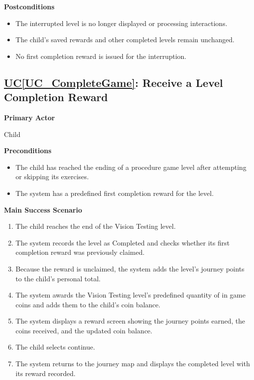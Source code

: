 \documentclass[12pt]{article}
\newcounter{ucnum} %
\newcommand{\ucref}[1]{\hyperref[#1]{UC\ref*{#1}}}
\begin{document}
\textbf{Postconditions}
\begin{itemize}
    \item The interrupted level is no longer displayed or processing
    interactions.
    \item The child's saved rewards and other completed levels
    remain unchanged.
    \item No first completion reward is issued for the interruption.
\end{itemize}

\label{UC_CompleteGame}
\subsection{\ucref{UC_CompleteGame}: Receive a Level Completion Reward}

\textbf{Primary Actor}

Child

\textbf{Preconditions}
\begin{itemize}
    \item The child has reached the ending of a procedure game level
    after attempting or skipping its exercises.
    \item The system has a predefined first completion reward for
    the level.
\end{itemize}

\textbf{Main Success Scenario}
\begin{enumerate}
    \item The child reaches the end of the Vision Testing level.
    \item The system records the level as Completed and checks
    whether its first completion reward was previously claimed.
    \item Because the reward is unclaimed, the system adds the
    level's journey points to the child's personal total.
    \item The system awards the Vision Testing level's predefined
    quantity of in game coins and adds them to the child's coin balance.
    \item The system displays a reward screen showing the journey
    points earned, the coins received, and the updated coin balance.
    \item The child selects continue.
    \item The system returns to the journey map and displays the
    completed level with its reward recorded.
\end{enumerate}
\end{document}
